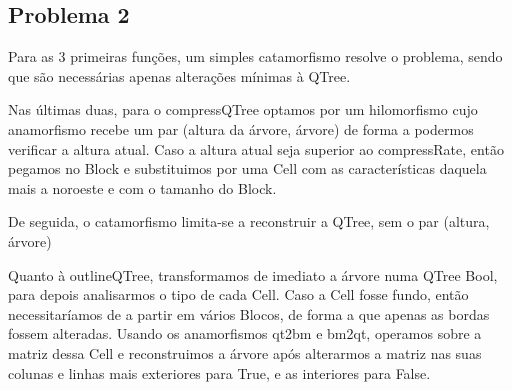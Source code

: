 \documentclass[a4paper]{article}
\newcommand{\Conid}[1]{\mathit{#1}}
\newcommand{\Varid}[1]{\mathit{#1}}
\def\resethooks{%
  \global\let\SaveRestoreHook\empty
  \global\let\ColumnHook\empty}
\newlength{\blanklineskip}
\newcommand{\hsindent}[1]{\quad}%
\begin{document}
\resethooks


\subsection*{Problema 2}

Para as 3 primeiras funções, um simples catamorfismo resolve o problema, sendo que
são necessárias apenas alterações mínimas à QTree.

Nas últimas duas, para o compressQTree optamos por um hilomorfismo cujo anamorfismo
recebe um par (altura da árvore, árvore) de forma a podermos verificar a altura atual.
Caso a altura atual seja superior ao compressRate, então pegamos no Block e substituimos
por uma Cell com as características daquela mais a noroeste e com o tamanho do Block.

De seguida, o catamorfismo limita-se a reconstruir a QTree, sem o par (altura, árvore)

Quanto à outlineQTree, transformamos de imediato a árvore numa QTree Bool, para
depois analisarmos o tipo de cada Cell. Caso a Cell fosse fundo, então necessitaríamos
de a partir em vários Blocos, de forma a que apenas as bordas fossem alteradas. Usando
os anamorfismos qt2bm e bm2qt, operamos sobre a matriz dessa Cell e reconstruimos a árvore
após alterarmos a matriz nas suas colunas e linhas mais exteriores para True, e as interiores para False.
\end{document}
